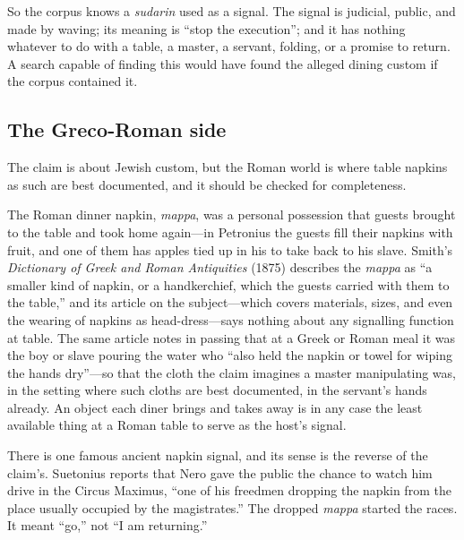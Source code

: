 So the corpus knows a \emph{sudarin} used as a signal. The signal is judicial,
public, and made by waving; its meaning is ``stop the execution''; and it has
nothing whatever to do with a table, a master, a servant, folding, or a
promise to return. A search capable of finding this would have found the
alleged dining custom if the corpus contained it.

\subsection{The Greco-Roman side}

The claim is about Jewish custom, but the Roman world is where table napkins as
such are best documented, and it should be checked for completeness.

The Roman dinner napkin, \emph{mappa}, was a personal possession that guests
brought to the table and took home again---in Petronius the guests fill their
napkins with fruit, and one of them has apples tied up in his to take back to
his slave. Smith's \emph{Dictionary of Greek and Roman Antiquities} (1875)
describes the \emph{mappa} as ``a smaller kind of napkin, or a handkerchief,
which the guests carried with them to the table,'' and its article on the
subject---which covers materials, sizes, and even the wearing of napkins as
head-dress---says nothing about any signalling function at
table. The same article
notes in passing that at a Greek or Roman meal it was the boy or slave pouring
the water who ``also held the napkin or towel for wiping the hands dry''---so
that the cloth the claim imagines a master manipulating was, in the setting
where such cloths are best documented, in the servant's hands already. An object
each diner brings and takes away is in any case the least available thing at a
Roman table to serve as the host's signal.

There is one famous ancient napkin signal, and its sense is the reverse of the
claim's. Suetonius reports that Nero gave the public the chance to watch him
drive in the Circus Maximus, ``one of his freedmen dropping the napkin from the
place usually occupied by the magistrates.''
The dropped \emph{mappa} started the races. It meant ``go,'' not ``I am
returning.''

